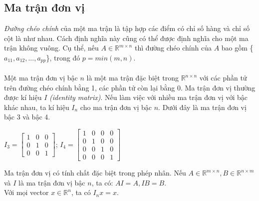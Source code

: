 \documentclass[12pt,a4paper]{report}
\begin{document}
\subsection{Ma trận đơn vị}
\textit{Đường chéo chính} của một ma trận là tập hợp các điểm có chỉ số hàng và chỉ số cột là như nhau. Cách định nghĩa này cũng có thể được định nghĩa cho một ma trận không vuông. Cụ thể, nếu $A \in \mathbb{R}^{m \times n}$ thì đường chéo chính của $A$ bao gồm \{$a_{11}, a_{12}, ..., a_{pp}$\}, trong đó $p = min(m,n)$.\\\\
Một ma trận đơn vị bậc $n$ là một ma trận đặc biệt trong $\mathbb{R}^{n \times n}$ với các phần tử trên đường chéo chính bằng 1, các phần tử còn lại bằng 0. Ma trận đơn vị thường được kí hiệu $I$ \textit{(identity matrix)}. Nếu làm việc với nhiều ma trận đơn vị với bậc khác nhau, ta kí hiệu $I_n$ cho ma trận đơn vị bậc $n$. Dưới đây là ma trận đơn vị bậc 3 và bậc 4.
\begin{center}
	$I_3 = \begin{bmatrix}
	1&0&0\\0&1&0\\0&0&1
	\end{bmatrix}$; $I_4 = \begin{bmatrix}
	1&0&0&0\\0&1&0&0\\0&0&1&0\\0&0&0&1
	\end{bmatrix}$
\end{center}
Ma trận đơn vị có tính chất đặc biệt trong phép nhân. Nếu $A \in \mathbb{R}^{m \times n}, B \in \mathbb{R}^{n \times m}$ và $I$ là ma trận đơn vị bậc $n$, ta có: $AI =A, IB = B$.\\Với mọi vector $x \in \mathbb{R}^n$, ta có $I_nx = x$.
\end{document}
